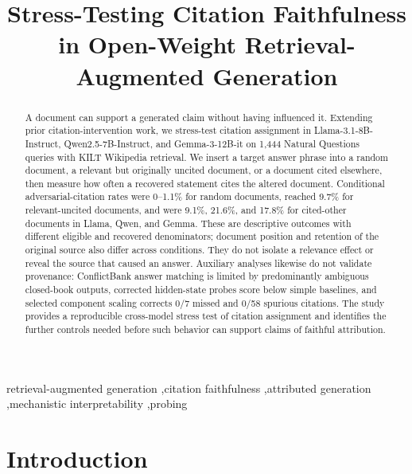 \documentclass[a4paper,fleqn]{cas-sc}
\begin{document}
\let\WriteBookmarks\relax
\def\floatpagepagefraction{1}
\def\textpagefraction{.001}
\sloppy

\shortauthors{}

\title[mode = title]{Stress-Testing Citation Faithfulness in Open-Weight Retrieval-Augmented Generation}

\begin{abstract}
A document can support a generated claim without having influenced it. Extending prior citation-intervention work, we stress-test citation assignment in Llama-3.1-8B-Instruct, Qwen2.5-7B-Instruct, and Gemma-3-12B-it on 1,444 Natural Questions queries with KILT Wikipedia retrieval. We insert a target answer phrase into a random document, a relevant but originally uncited document, or a document cited elsewhere, then measure how often a recovered statement cites the altered document. Conditional adversarial-citation rates were 0--1.1\% for random documents, reached 9.7\% for relevant-uncited documents, and were 9.1\%, 21.6\%, and 17.8\% for cited-other documents in Llama, Qwen, and Gemma. These are descriptive outcomes with different eligible and recovered denominators; document position and retention of the original source also differ across conditions. They do not isolate a relevance effect or reveal the source that caused an answer. Auxiliary analyses likewise do not validate provenance: ConflictBank answer matching is limited by predominantly ambiguous closed-book outputs, corrected hidden-state probes score below simple baselines, and selected component scaling corrects 0/7 missed and 0/58 spurious citations. The study provides a reproducible cross-model stress test of citation assignment and identifies the further controls needed before such behavior can support claims of faithful attribution.
\end{abstract}

\begin{keywords}
retrieval-augmented generation \sep citation faithfulness \sep attributed generation \sep mechanistic interpretability \sep probing
\end{keywords}

\maketitle

\section{Introduction}
\label{sec:introduction}
\end{document}
